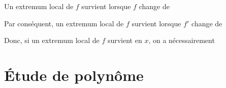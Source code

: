 %

%	

\begin{corollaire}
	Un extremum local de $f$ survient lorsque $f$ change de 

	Par conséquent, un extremum local de $f$ survient lorsque $f'$ change de 
	
	Donc, si un extremum local de $f$ survient en $x$, on a nécessairement 
\end{corollaire}

\section{Étude de polynôme}

